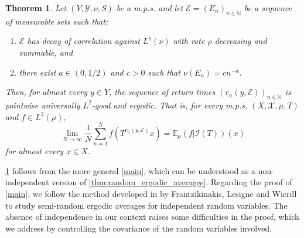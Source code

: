 \documentclass[11pt]{amsart}
\numberwithin{equation}{section}
\theoremstyle{definition}
\theoremstyle{plain}
\newcommand{\N}{{\mathbb N}}
\newtheorem{theoremL}{Theorem}
\begin{document}
\begin{theoremL}
    Let $(Y,\mathcal{Y},\nu,S)$ be a m.p.s. and let $\mathcal{E}=(E_n)_{n\in \N}$ be a sequence of measurable sets such that:
    \begin{enumerate}
        \item  $\mathcal{E}$ has decay of correlation against $L^1(\nu)$ with rate $\rho$ decreasing and summable, and \label{C1}
        \item there exist $a\in (0,1/2)$ and $c>0$ such that $\nu(E_n)=cn^{-a}$.\label{C2}
       
    \end{enumerate}  Then, for almost every $y\in Y$, the sequence of return times $(r_n(y,\mathcal{E}))_{n\in \N}$ is pointwise universally $L^2$-good and ergodic. That is, for every m.p.s. $(X,\mathcal{X},\mu,T)$ and $f\in L^{2}(\mu)$,
    \begin{equation}
        \lim_{N\to\infty}\dfrac{1}{N}\sum_{n=1}^Nf(T^{r_n(y,\mathcal{E})}x)=\mathbb{E}_\mu(f|\mathcal{I}(T))(x)\label{eqn:thmA}
    \end{equation}
   for almost every $x\in X$.\label{thmA}
\end{theoremL}
\cref{thmA} follows from the more general \cref{main}, which can be understood as a non-independent version of \cref{thm:random_ergodic_averages}. Regarding the proof of \cref{main}, we follow the method developed in \cite{Frantzikinakis_Lesigne_Wierdl} by Frantzikinakis, Lesigne and Wierdl to study semi-random ergodic averages for independent random variables. The absence of independence in our context raises some difficulties in the proof, which we address by controlling the covariance of the random variables involved. 
\end{document}
